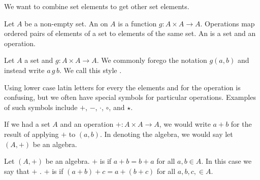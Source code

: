 
\sbasic





\sstart
{}


We want to combine set elements to get other set elements.



Let $A$ be a non-empty set.
An  on $A$ is a function $g: A \times A \to A$.
Operations map ordered pairs of elements of a set to elements of the same set.
An  is a set and an operation.



Let $A$ a set and $g: A \times A \to A$.
We commonly forego the notation $g(a, b)$ and instead write $a\,g\,b$.
We call this style .

Using lower case latin letters for every the elements and for the operation is confusing, but we often have special symbols for particular operations.
Examples of such symbols include $+$, $-$, $\cdot$, $\circ$, and $\star$.

If we had a set $A$ and an operation $+: A \times A \to A$, we would write $a+b$ for the result of applying $+$ to $(a,b)$.
In denoting the algebra, we would say let $(A, +)$ be an algebra.


Let $(A, +)$ be an algebra.
$+$ is  if $a + b = b + a$ for all $a, b \in A$.
In this case we say that $+$ .
$+$ is  if $(a + b) + c = a + (b + c)$ for all $a, b, c, \in A$.


\strats
